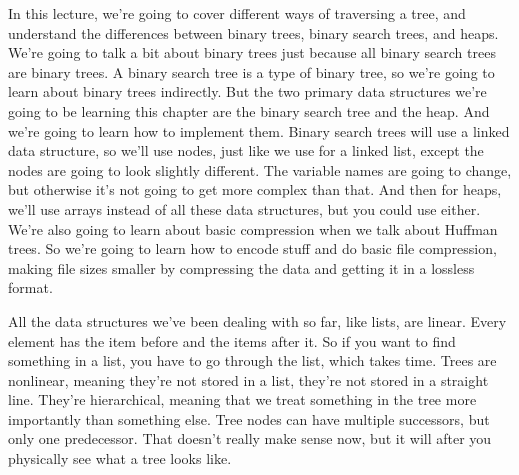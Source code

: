 In this lecture, we're going to cover different ways of traversing a tree, and understand the differences between binary trees, binary search trees, and heaps. We're going to talk a bit about binary trees just because all binary search trees are binary trees. A binary search tree is a type of binary tree, so we're going to learn about binary trees indirectly. But the two primary data structures we're going to be learning this chapter are the binary search tree and the heap. And we're going to learn how to implement them. Binary search trees will use a linked data structure, so we'll use nodes, just like we use for a linked list, except the nodes are going to look slightly different. The variable names are going to change, but otherwise it's not going to get more complex than that. And then for heaps, we'll use arrays instead of all these data structures, but you could use either. We're also going to learn about basic compression when we talk about Huffman trees. So we're going to learn how to encode stuff and do basic file compression, making file sizes smaller by compressing the data and getting it in a lossless format.

All the data structures we've been dealing with so far, like lists, are linear. Every element has the item before and the items after it. So if you want to find something in a list, you have to go through the list, which takes time. Trees are nonlinear, meaning they're not stored in a list, they're not stored in a straight line. They're hierarchical, meaning that we treat something in the tree more importantly than something else. Tree nodes can have multiple successors, but only one predecessor. That doesn't really make sense now, but it will after you physically see what a tree looks like.

